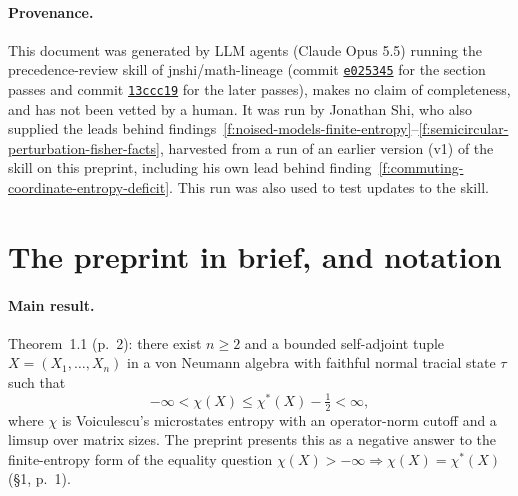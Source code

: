 \documentclass[11pt]{article}
\newcommand{\ploc}[2]{#1}
\newcounter{finding}
\begin{document}
\paragraph{Provenance.}
This document was generated by LLM agents (Claude Opus 5.5) running the
precedence-review skill of jnshi/math-lineage (commit
\href{https://github.com/jnshi/math-lineage/tree/e025345/.agents/skills/precedence-review}{\texttt{e025345}}
for the section passes and commit
\href{https://github.com/jnshi/math-lineage/tree/13ccc19/.agents/skills/precedence-review}{\texttt{13ccc19}}
for the later passes), makes no claim of completeness, and has not been
vetted by a human. It was run by Jonathan Shi, who also supplied the leads
behind findings~\ref{f:noised-models-finite-entropy}--\ref{f:semicircular-perturbation-fisher-facts},
harvested from a run of an earlier version (v1) of the skill on this
preprint, including his own lead behind
finding~\ref{f:commuting-coordinate-entropy-deficit}. This run was also used to
test updates to the skill.
\space%
\section{The preprint in brief, and notation}\label{sec:overview}

\paragraph{Main result.}
\ploc{Theorem~1.1 (p.~2)}{01-introduction.tex:42--51}: there exist $n\ge2$
and a bounded self-adjoint tuple $X=(X_1,\dots,X_n)$ in a von Neumann algebra
with faithful normal tracial state $\tau$ such that
\[
 -\infty<\chi(X)\le\chi^*(X)-\tfrac12<\infty,
\]
where $\chi$ is Voiculescu's microstates entropy with an operator-norm cutoff
and a limsup over matrix sizes. The preprint presents this as a negative answer
to the finite-entropy form of the equality question
$\chi(X)>-\infty\Rightarrow\chi(X)=\chi^*(X)$
\ploc{(\S1, p.~1)}{01-introduction.tex:17--26}.
\end{document}
